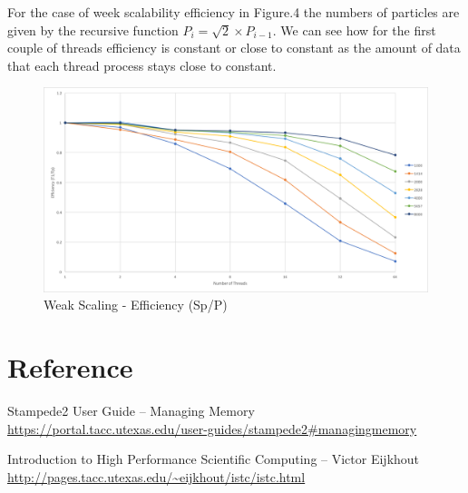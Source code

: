 \documentclass[12pt]{article} %
\begin{document}
\newpage

For the case of week scalability efficiency in Figure.4 the numbers of particles are given by the recursive function $ P_i = \sqrt{2} \times P_{i-1} $. We can see how for the first couple of threads efficiency is constant or close to constant as the amount of data that each thread process stays close to constant.

\begin{figure}[htb]
\caption{Weak Scaling - Efficiency (Sp/P)}\label{fig:benchmark02}
\centering
\includegraphics[width=\textwidth,keepaspectratio]{imgs/img04.png}
\end{figure}



\section{Reference}

\begin{flushleft}
Stampede2 User Guide -- Managing Memory \\ \url{https://portal.tacc.utexas.edu/user-guides/stampede2#managingmemory}

Introduction to High Performance Scientific Computing -- Victor Eijkhout \\ \url{http://pages.tacc.utexas.edu/~eijkhout/istc/istc.html}
\end{flushleft}

\newpage
\end{document}
